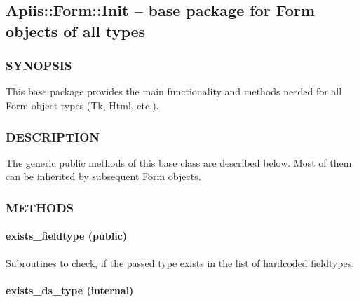\subsection{Apiis::Form::Init -- base package for Form objects of all types\label{Apiis::Form::Init_--_base_package_for_Form_objects_of_all_types}}




\subsubsection*{SYNOPSIS\label{Apiis::Form::Init_--_base_package_for_Form_objects_of_all_types_SYNOPSIS}}


This base package provides the main functionality and methods needed for
all Form object types (Tk, Html, etc.).

\subsubsection*{DESCRIPTION\label{Apiis::Form::Init_--_base_package_for_Form_objects_of_all_types_DESCRIPTION}}


The generic public methods of this base class are described below. Most of
them can be inherited by subsequent Form objects.

\subsubsection*{METHODS\label{Apiis::Form::Init_--_base_package_for_Form_objects_of_all_types_METHODS}}
\paragraph*{exists\_fieldtype (public)\label{Apiis::Form::Init_--_base_package_for_Form_objects_of_all_types_exists_fieldtype_public_}}


Subroutines to check, if the passed type exists in the
list of hardcoded fieldtypes.

\paragraph*{exists\_ds\_type (internal)\label{Apiis::Form::Init_--_base_package_for_Form_objects_of_all_types_exists_ds_type_internal_}}


